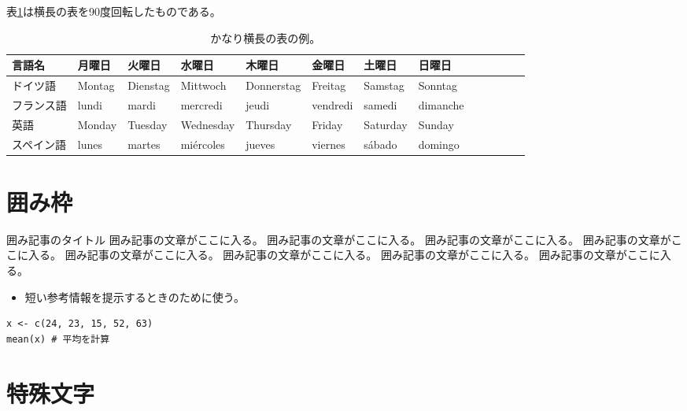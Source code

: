 \documentclass[ %
  a5paper,%
  papersize%
]{ltjsbook}
\newcommand{\sanko}[1]{%
  \begin{itemize}
    \item[\mysbox{\small\gtfamily 参考}] #1
  \end{itemize}
}
\begin{document}
表\ref{tb:wide-table-example}は横長の表を90度回転したものである。

\begin{landscape}
  \begin{table}
    \caption{かなり横長の表の例。}
    \label{tb:wide-table-example}
    \begin{center}
      \begin{tabular}{lllllllllllll} \toprule
        言語名   & 月曜日     & 火曜日      & 水曜日       & 木曜日        & 金曜日       & 土曜日      & 日曜日      \\ \midrule
        ドイツ語  & Montag  & Dienstag & Mittwoch  & Donnerstag & Freitag   & Samstag  & Sonntag  \\
        フランス語 & lundi   & mardi    & mercredi  & jeudi      & vendredi  & samedi   & dimanche \\
        英語    & Monday  & Tuesday  & Wednesday & Thursday   & Friday    & Saturday & Sunday   \\
        スペイン語 & lunes   & martes   & miércoles & jueves     & viernes   & sábado   & domingo  \\ \bottomrule
      \end{tabular}
    \end{center}
  \end{table}
\end{landscape}

\section{囲み枠}

\begin{note}{囲み記事のタイトル}
囲み記事の文章がここに入る。
囲み記事の文章がここに入る。
囲み記事の文章がここに入る。
囲み記事の文章がここに入る。
囲み記事の文章がここに入る。
囲み記事の文章がここに入る。
囲み記事の文章がここに入る。
囲み記事の文章がここに入る。
\end{note}


\sanko{短い参考情報を提示するときのために使う。}

\begin{lstlisting}[caption=簡単なプログラムの例, label=ls:example]
x <- c(24, 23, 15, 52, 63)
mean(x) # 平均を計算
\end{lstlisting}


\section{特殊文字}
\end{document}
